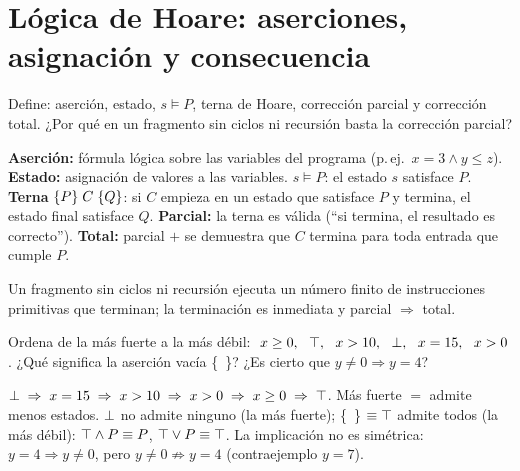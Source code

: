 \section{Lógica de Hoare: aserciones, asignación y consecuencia}

\begin{prob}
Define: aserción, estado, $s\models P$, terna de Hoare, corrección parcial y corrección total. ¿Por qué en un fragmento sin ciclos ni recursión basta la corrección parcial?
\end{prob}
\begin{sol}
\textbf{Aserción:} fórmula lógica sobre las variables del programa (p.\,ej.\ $x=3\land y\le z$). \textbf{Estado:} asignación de valores a las variables. $s\models P$: el estado $s$ satisface $P$. \textbf{Terna} $\{P\}\;C\;\{Q\}$: si $C$ empieza en un estado que satisface $P$ y termina, el estado final satisface $Q$. \textbf{Parcial:} la terna es válida (``si termina, el resultado es correcto''). \textbf{Total:} parcial $+$ se demuestra que $C$ termina para toda entrada que cumple $P$.

Un fragmento sin ciclos ni recursión ejecuta un número finito de instrucciones primitivas que terminan; la terminación es inmediata y parcial $\Rightarrow$ total.
\end{sol}

\begin{prob}
Ordena de la más fuerte a la más débil: $\;x\ge0,\ \ \T,\ \ x>10,\ \ \F,\ \ x=15,\ \ x>0$. ¿Qué significa la aserción vacía \{\ \}? ¿Es cierto que $y\neq0\Rightarrow y=4$?
\end{prob}
\begin{sol}
$\bot\;\Rightarrow\;x=15\;\Rightarrow\;x>10\;\Rightarrow\;x>0\;\Rightarrow\;x\ge0\;\Rightarrow\;\top$.
Más fuerte $=$ admite menos estados. $\bot$ no admite ninguno (la más fuerte); \{\ \} $\equiv\top$ admite todos (la más débil): $\top\land P\equiv P$, $\top\lor P\equiv\top$. La implicación no es simétrica: $y=4\Rightarrow y\ne0$, pero $y\ne0\not\Rightarrow y=4$ (contraejemplo $y=7$).
\end{sol}

